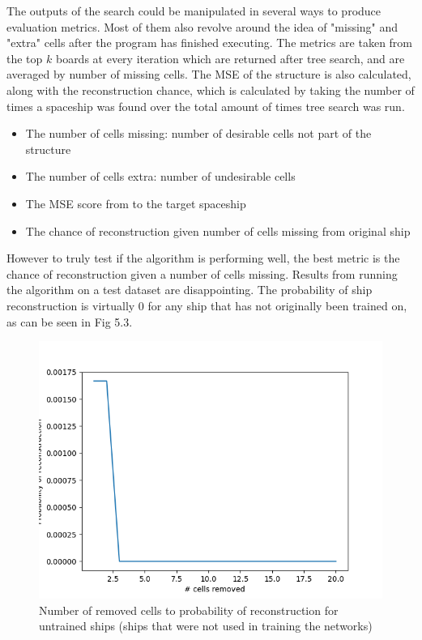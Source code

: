 \documentclass{l4proj}
\begin{document}

The outputs of the search could be manipulated in several ways to produce evaluation metrics. Most of them also revolve around the idea of "missing" and "extra" cells after the program has finished executing. The metrics are taken from the top $k$ boards at every iteration which are returned after tree search, and are averaged by number of missing cells. The MSE of the structure is also calculated, along with the reconstruction chance, which is calculated by taking the number of times a spaceship was found over the total amount of times tree search was run.


\begin{itemize}
    \item The number of cells missing: number of desirable cells not part of the structure
    \item The number of cells extra: number of undesirable cells
    \item The MSE score from to the target spaceship
    \item The chance of reconstruction given number of cells missing from original ship
\end{itemize}

However to truly test if the algorithm is performing well, the best metric is the chance of reconstruction given a number of cells missing. Results from running the algorithm on a test dataset are disappointing. The probability of ship reconstruction is virtually 0 for any ship that has not originally been trained on, as can be seen in Fig 5.3.

\begin{figure}[h!]
\centering
\includegraphics[width=0.8\linewidth]{dissertation/images/graphs/probability_of_reconstruction_against_damage_testin_only.png}
\caption{Number of removed cells to probability of reconstruction for untrained ships (ships that were not used in training the networks)}
\label{fig:subim1}
\end{figure}
\end{document}
